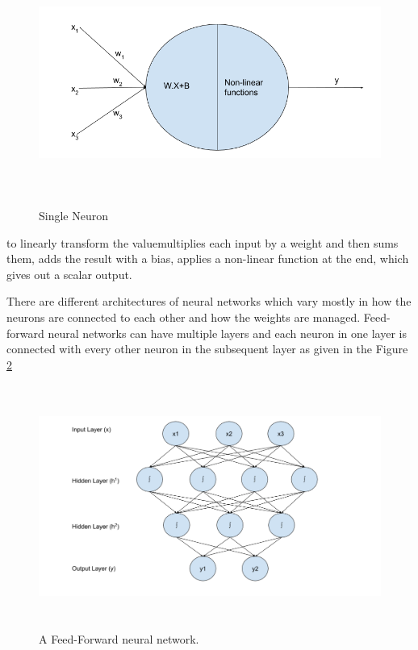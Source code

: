 \documentclass[a4paper, 11pt]{article}
\begin{document}
\begin{figure}[htpb]
    \centering
    \includegraphics[width=\textwidth,height=8cm,keepaspectratio=true]
    {single-neuron.png}
    \caption{
        Single Neuron
    }
    \label{fig:single_neuron}
\end{figure}

 to linearly transform the valuemultiplies each input by a weight and then sums them, adds the result with a bias, applies a non-linear function at the end, which gives out a scalar output. 



There are different architectures of neural networks which vary mostly in how the neurons are connected to each other and how the weights are managed. Feed-forward neural networks \parencite{Svozil1997} can have multiple layers and each neuron in one layer is connected with every other neuron in the subsequent layer as given in the Figure \ref{fig:Feed forward neural network}

\begin{figure}[htpb]
    \centering
    \includegraphics[width=\textwidth,height=8cm,keepaspectratio=true]
    {feed-forward-neural-network.png}
    \caption{
        A Feed-Forward neural network.
    }
    \label{fig:Feed forward neural network}
\end{figure}
\end{document}
